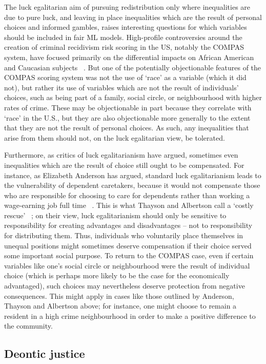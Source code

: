 \documentclass[pmlr,twocolumn,10pt]{jmlr}%
\begin{document}
The luck egalitarian aim of pursuing redistribution only where inequalities are due to pure luck, and leaving in place inequalities which are the result of personal choices and informed gambles, raises interesting questions for which variables should be included in fair ML models. High-profile controversies around the creation of criminal recidivism risk scoring in the US, notably the COMPAS system, have focused primarily on the differential impacts on African American and Caucasian subjects ~\cite{angwin2016machine}. But one of the potentially objectionable features of the COMPAS scoring system was not the use of `race' as a variable (which it did not), but rather its use of variables which are not the result of individuals' choices, such as being part of a family, social circle, or neighbourhood with higher rates of crime. These may be objectionable in part because they correlate with `race' in the U.S., but they are also objectionable more generally to the extent that they are not the result of personal choices. As such, any inequalities that arise from them should not, on the luck egalitarian view, be tolerated.

Furthermore, as critics of luck egalitarianism have argued, sometimes even inequalities which are the result of choice still ought to be compensated. For instance, as Elizabeth Anderson has argued, standard luck egalitarianism leads to the vulnerability of dependent caretakers, because it would not compensate those who are responsible for choosing to care for dependents rather than working a wage-earning job full time ~\cite{anderson1999point}. This is what Thayson and Albertson call a `costly rescue' ~\cite{thaysen2017bad}; on their view, luck egalitarianism should only be sensitive to responsibility for creating advantages and disadvantages -- not to responsibility for distributing them. Thus, individuals who voluntarily place themselves in unequal positions might sometimes deserve compensation if their choice served some important social purpose. To return to the COMPAS case, even if certain variables like one's social circle or neighbourhood were the result of individual choice (which is perhaps more likely to be the case for the economically advantaged), such choices may nevertheless deserve protection from negative consequences. This might apply in cases like those outlined by Anderson, Thayson and Albertson above; for instance, one might choose to remain a resident in a high crime neighbourhood in order to make a positive difference to the community.

\subsection{Deontic justice}
\end{document}

